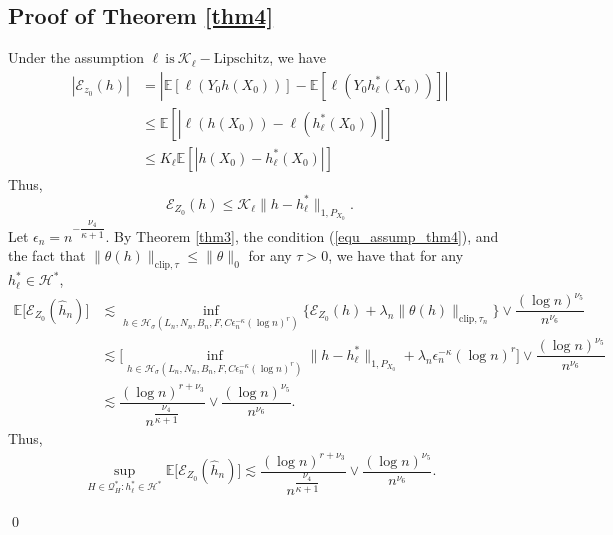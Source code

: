 \documentclass[10pt,twoside]{article}
\numberwithin{equation}{section}
\newcommand{\E}{\ensuremath{\mathbb{E}}}
\begin{document}
\subsection { Proof of Theorem \ref{thm4}}
% 
Under the assumption $\ell ~ \text{is} ~ \mathcal{K}_{\ell}-\text{Lipschitz} $, we have
%
\
\begin{align*}
|\mathcal{E}_{z_0} (h) | & =  | \E[\ell(Y_0 h (X_0))] - \E[\ell(Y_0 h_{\ell}^{*} (X_0))]|  
\\
& \leq \E[|\ell (h (X_0)) - \ell (h_{\ell}^{*} (X_0))|] 
\\
&  \leq K_{\ell} \E [|h (X_0) - h_{\ell}^{*} (X_0)|]
\end{align*}
%
%
Thus,
%
\[\mathcal{E}_{Z_0} (h) \leq \mathcal{K}_{\ell} \| h - h_{\ell}^{*} \|_{1, P_{X_0} }. 
  \]
 Let $ \epsilon_n = n^{-\dfrac{\nu_4}{\kappa + 1}}$. By Theorem \ref{thm3}, the condition (\ref{equ_assump_thm4}), and the fact that $ \| \theta (h)\|_{\text{clip}, \tau} \leq \| \theta\|_0$ for any  $ \tau > 0$, we have that for any $ h_{\ell}^ {*} \in \mathcal{H}^ {*} $,
%
\begin{align}
\nonumber \E \Big[ \mathcal{E}_{Z_0} (\widehat{h}_n)\Big] & \lesssim \underset{h \in \mathcal{H}_{\sigma}(L_n, N_n, B_n, F, C \epsilon_n^{-\kappa} (\log n)^r)}{\inf} \Big\{ \mathcal{ E}_{Z_0} (h) +  \lambda_n \| \theta (h) \|_{\text{clip}, \tau_n} \Big\} \lor \dfrac{ (\log n)^{\nu_5}}{n^{\nu_6}}
\\
\nonumber & \lesssim  \Big[  \underset{h \in \mathcal{H}_{\sigma}(L_n, N_n, B_n, F, C \epsilon_n^ {-\kappa} (\log n) ^r)}{\inf} \| h -  h_{\ell}^ {*} \|_ {1, P_ {X_0}}  + \lambda_n \epsilon_n^ {- \kappa}  (\log n) ^r \Big] \lor \dfrac{ (\log n) ^{\nu_5}}{n^ {\nu_6}}
\\
\nonumber & \lesssim \dfrac{ (\log n)^ {r + \nu_3}}{n^{ \dfrac{\nu_4}{\kappa +1}}} \lor \dfrac{ (\log n)^ {\nu_5} }{n^ {\nu_6}}.
\end{align}
%
Thus,
\begin{align}
\underset{H \in \mathcal{Q}_{H}^ {*}: h_{\ell}^ {*} \in \mathcal{H}^ {*}}{\sup} \E \Big[ \mathcal{E}_{Z_0} (\widehat{h}_n) \Big] \lesssim \dfrac{ (\log n)^ {r + \nu_3}} {n^ { \dfrac{\nu_4}{\kappa + 1}}} \lor  \dfrac{ (\log n)^ {\nu_5} }{n^ {\nu_6}}.
\end{align}
%

\qed
\end{document}
